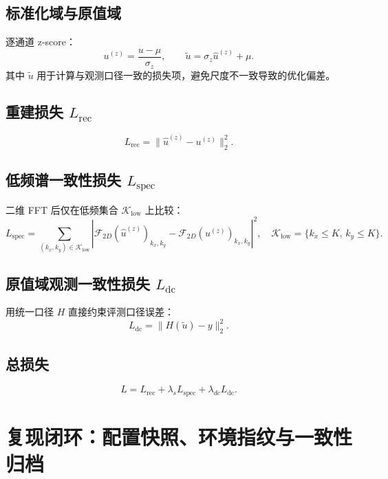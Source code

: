\subsection{标准化域与原值域}
逐通道 z-score：
\begin{equation}
u^{(z)}=\frac{u-\mu}{\sigma_{z}},\qquad
\tilde{u}=\sigma_{z}\hat{u}^{(z)}+\mu.
\label{eq:zscore}
\end{equation}
其中 $\tilde{u}$ 用于计算与观测口径一致的损失项，避免尺度不一致导致的优化偏差。

\subsection{重建损失 \texorpdfstring{$L_{\mathrm{rec}}$}{Lrec}}
\begin{equation}
L_{\mathrm{rec}}=\big\|\hat{u}^{(z)}-u^{(z)}\big\|_2^2.
\label{eq:Lrec}
\end{equation}

\subsection{低频谱一致性损失 \texorpdfstring{$L_{\mathrm{spec}}$}{Lspec}}
二维 FFT 后仅在低频集合 $\mathcal{K}_{\mathrm{low}}$ 上比较：
\begin{equation}
L_{\mathrm{spec}}=
\sum_{(k_x,k_y)\in\mathcal{K}_{\mathrm{low}}}
\left|\mathcal{F}_{2D}(\hat{u}^{(z)})_{k_x,k_y}
-\mathcal{F}_{2D}(u^{(z)})_{k_x,k_y}\right|^2,
\quad \mathcal{K}_{\mathrm{low}}=\{k_x\le K,\,k_y\le K\}.
\label{eq:Lspec}
\end{equation}

\subsection{原值域观测一致性损失 \texorpdfstring{$L_{\mathrm{dc}}$}{Ldc}}
用统一口径 $H$ 直接约束评测口径误差：
\begin{equation}
L_{\mathrm{dc}}=\big\|H(\tilde{u})-y\big\|_2^2.
\label{eq:Ldc}
\end{equation}

\subsection{总损失}
\begin{equation}
L = L_{\mathrm{rec}}+\lambda_s L_{\mathrm{spec}}+\lambda_{dc}L_{\mathrm{dc}}.
\label{eq:total_loss}
\end{equation}

\section{复现闭环：配置快照、环境指纹与一致性归档}
\label{sec:reproducibility}

